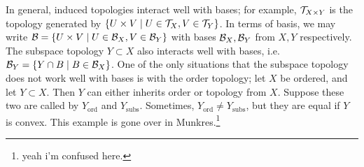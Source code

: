 \noindent In general, induced topologies interact well with bases; for example, $\mathcal T_{X \times Y}$ is the topology generated by $\{U \times V \mid U \in \mathcal T_X, V \in \mathcal T_Y\}$. In terms of basis, we may write $\mathcal B = \{U \times V \mid U \in \mathcal B_X, V \in \mathcal B_Y\}$ with bases $\mathcal B_X, \mathcal B_Y$ from $X, Y$ respectively.
\medskip\newline
The subspace topology $Y \subset X$ also interacts well with bases, i.e. $\mathcal B_Y = \{Y \cap B \mid B \in \mathcal B_X\}$. One of the only situations that the subspace topology does not work well with bases is with the order topology; let $X$ be ordered, and let $Y \subset X$. Then $Y$ can either inherits order or topology from $X$. Suppose these two are called by $Y_\mathrm{ord}$ and $Y_\mathrm{subs}$. Sometimes, $Y_\mathrm{ord} \neq Y_\mathrm{subs}$, but they are equal if $Y$ is convex. This example is gone over in Munkres.\footnote{yeah i'm confused here.}